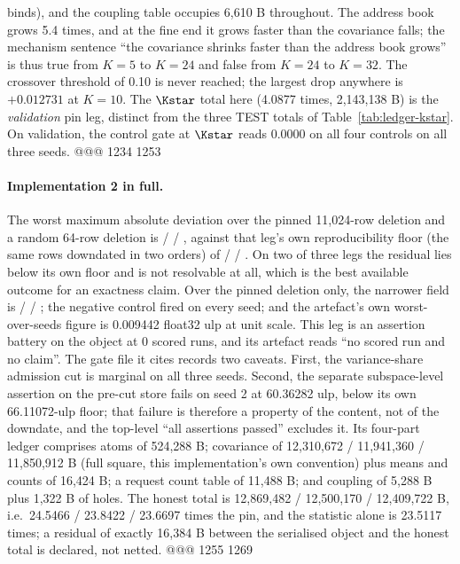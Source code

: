 binds), and the coupling table occupies 6,610 B throughout. The address book grows 5.4 times, and
at the fine end it grows faster than the covariance falls; the mechanism sentence ``the
covariance shrinks faster than the address book grows'' is thus true from $K=5$ to $K=24$ and
false from $K=24$ to $K=32$. The crossover threshold of 0.10 is never reached; the largest drop
anywhere is $+0.012731$ at $K=10$. The $\Kstar$ total here (4.0877 times, 2,143,138 B) is the
\emph{validation} pin leg, distinct from the three TEST totals of Table~\ref{tab:ledger-kstar}. %
On validation, the control gate at $\Kstar$ reads 0.0000 on all four controls on all three seeds.
@@@ 1234 1253
\paragraph{Implementation 2 in full.} The worst maximum absolute deviation over the pinned
11,024-row deletion and a random 64-row deletion is  /  /
, against that leg's own reproducibility floor (the same rows downdated in two
orders) of  /  / . On two of three legs the
residual lies below its own floor and is not resolvable at all, which is the best available outcome
for an exactness claim. Over the pinned deletion only, the narrower field is  /
 / ; the negative control fired on every seed; and the artefact's
own worst-over-seeds figure is 0.009442 float32 ulp at unit scale. %
This leg is an assertion battery on the object at 0 scored runs, and its artefact reads ``no
scored run and no claim''. The gate file it cites records two caveats. First, the variance-share
admission cut is marginal on all three seeds. Second, the separate subspace-level assertion on the
pre-cut store fails on seed 2 at 60.36282 ulp, below its own 66.11072-ulp floor; that failure is
therefore a property of the content, not of the downdate, and the top-level ``all assertions
passed'' excludes it. %
Its four-part ledger comprises atoms of 524,288 B; covariance of 12,310,672 / 11,941,360 /
11,850,912 B (full square, this implementation's own convention) plus means and counts of 16,424
B; a request count table of 11,488 B; and coupling of 5,288 B plus 1,322 B of holes. The honest
total is 12,869,482 / 12,500,170 / 12,409,722 B, i.e.\ 24.5466 / 23.8422 / 23.6697 times the pin,
and the statistic alone is 23.5117 times; a residual of exactly 16,384 B between the serialised
object and the honest total is declared, not netted. %
@@@ 1255 1269
